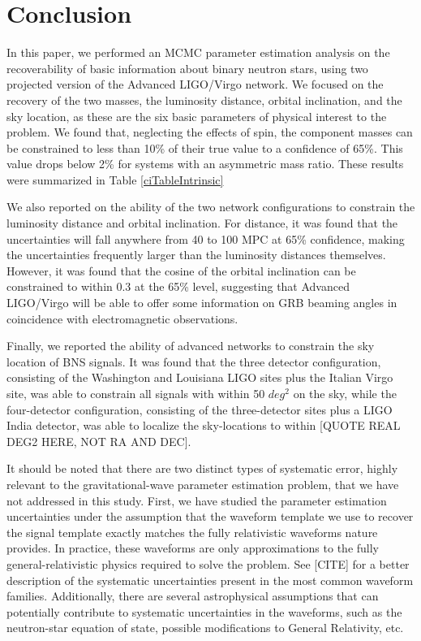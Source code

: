 \documentclass[11pt,a4paper]{emulateapj}
\newcommand{\carl}[1]{{\color{red}  #1}}
\begin{document}
\section{Conclusion}
\label{conclusionSection}

In this paper, we performed an MCMC parameter estimation analysis on the recoverability of basic information about binary 
neutron stars, using two projected version of the Advanced LIGO/Virgo network.  We focused on the recovery of the two 
masses, the luminosity distance, orbital inclination, and the sky location, as these are the six basic parameters of physical 
interest to the problem.  We found that, neglecting the effects of spin, the component masses can be constrained to less
 than 10\% of their true value to a confidence of 65\%.  This value drops below 2\% for systems with an asymmetric mass ratio.
 These results were summarized in Table \ref{ciTableIntrinsic}
 
We also reported on the ability of the two network configurations to constrain the
luminosity distance and orbital inclination.  For distance, it was found that the uncertainties
will fall anywhere from 40 to 100 MPC at 65\% confidence, making the uncertainties frequently larger than the luminosity
distances themselves.  However, it was found that the cosine of the orbital inclination can be constrained to within 
0.3 at the 65\% level, suggesting that Advanced LIGO/Virgo will be able to offer some information on GRB beaming
angles in coincidence with electromagnetic observations.

Finally, we reported the ability of advanced networks to constrain the sky location of BNS signals.  It was found that 
the three detector configuration, consisting of the Washington and Louisiana LIGO sites plus the Italian Virgo site,
 was able to constrain all signals with within 50 $deg^2$ on the sky, while the four-detector
configuration, consisting of the three-detector sites plus a LIGO India detector, was able to localize the sky-locations
to within \carl{[QUOTE REAL DEG2 HERE, NOT RA AND DEC]}.

It should be noted that there are two distinct types of systematic error, highly relevant to the gravitational-wave parameter estimation problem, that we have not addressed in this study.  First, we have studied the parameter estimation uncertainties under the assumption that the waveform template we use to recover the signal template exactly matches the fully relativistic waveforms nature provides.  In practice, these waveforms are only approximations to the fully general-relativistic physics required to solve the problem.  See \carl{[CITE]} for a better description of the systematic uncertainties present in the most common waveform families.  Additionally, there are several astrophysical assumptions that can potentially contribute
to systematic uncertainties in the waveforms, such as the neutron-star equation of state, possible modifications to 
General Relativity, etc.
\end{document}
